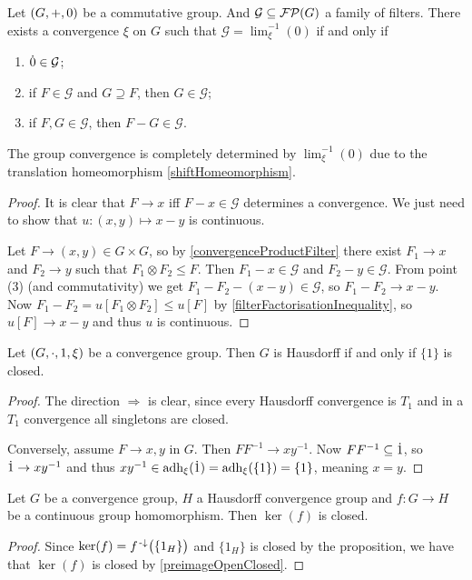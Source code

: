 \begin{proposition} \label{groupConvergenceConstruction}
Let $\sSet{G, +, 0}$ be a commutative group. And $\mathcal{G} \subseteq \operatorname{\mathcal{FP}}(G)$ a family of filters. There exists a convergence $\xi$ on $G$ such that $\mathcal{G} = \lim^{-1}_\xi(0)$ \textup{if and only if}
\begin{enumerate}
\item $\dot{0} \in \mathcal{G}$;
\item if $F \in \mathcal{G}$ and $G\supseteq F$, then $G\in \mathcal{G}$;
\item if $F,G\in \mathcal{G}$, then $F - G\in \mathcal{G}$.
\end{enumerate}
\end{proposition}
The group convergence is completely determined by $\lim^{-1}_\xi(0)$ due to the translation homeomorphism \ref{shiftHomeomorphism}.
\begin{proof}
It is clear that $F \to x$ iff $F - x \in \mathcal{G}$ determines a convergence. We just need to show that $u: (x,y) \mapsto x - y$ is continuous.

Let $F \to (x,y) \in G\times G$, so by \ref{convergenceProductFilter} there exist $F_1\to x$ and $F_2 \to y$ such that $F_1\otimes F_2 \leq F$. Then $F_1 - x \in \mathcal{G}$ and $F_2 - y \in \mathcal{G}$. From point (3) (and commutativity) we get $F_1 - F_2 - (x - y) \in \mathcal{G}$, so $F_1 - F_2 \to x-y$. Now $F_1 - F_2 = u[F_1\otimes F_2] \leq u[F]$ by \ref{filterFactorisationInequality}, so $u[F] \to x-y$ and thus $u$ is continuous.
\end{proof}

\begin{proposition} \label{HausdorffCriterionConvergenceGroup}
Let $\sSet{G,\cdot, 1, \xi}$ be a convergence group. Then $G$ is Hausdorff \textup{if and only if} $\{1\}$ is closed.
\end{proposition}
\begin{proof}
The direction $\Rightarrow$ is clear, since every Hausdorff convergence is $T_1$ and in a $T_1$ convergence all singletons are closed.

Conversely, assume $F\to x,y$ in $G$. Then $FF^{-1} \to xy^{-1}$. Now $FF^{-1} \subseteq \dot{1}$, so $\dot{1} \to xy^{-1}$ and thus $xy^{-1}\in \operatorname{adh}_\xi(\dot{1}) = \operatorname{adh}_\xi(\{1\}) = \{1\}$, meaning $x = y$.
\end{proof}
\begin{corollary} \label{kernelClosed}
Let $G$ be a convergence group, $H$ a Hausdorff convergence group and $f: G\to H$ be a continuous group homomorphism. Then $\ker(f)$ is closed.
\end{corollary}
\begin{proof}
Since $\ker(f) = f^{{\text{\hspace{0.15em}-}\downarrow}}\big(\{1_H\}\big)$ and $\{1_H\}$ is closed by the proposition, we have that $\ker(f)$ is closed by \ref{preimageOpenClosed}.
\end{proof}

